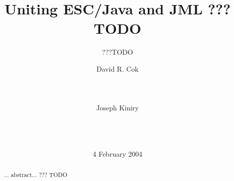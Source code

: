 \documentclass{acm_proc_article-sp}
\begin{document}
%

\title{Uniting ESC/Java and JML ???TODO}
\subtitle{???TODO}
%
%

%

\author{
%
\alignauthor David R. Cok\\
       \\
       \\
       \\
\alignauthor Joseph Kiniry\\
       \\
       \\
       \\
}
\date{4 February 2004}
\maketitle
\begin{abstract}
... abstract... ??? TODO
\end{abstract}
\end{document}
